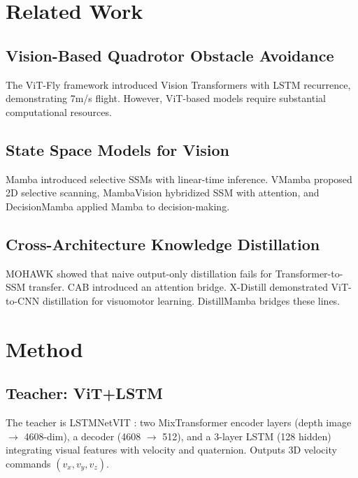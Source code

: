\documentclass{article}
\newcommand{\method}{DistillMamba\xspace}
\begin{document}
\section{Related Work}

\subsection{Vision-Based Quadrotor Obstacle Avoidance}
The ViT-Fly framework \cite{bhattacharya2024vitfly} introduced Vision Transformers with LSTM recurrence, demonstrating 7m/s flight. However, ViT-based models require substantial computational resources.

\subsection{State Space Models for Vision}
Mamba \cite{gu2023mamba} introduced selective SSMs with linear-time inference. VMamba \cite{liu2024vmamba} proposed 2D selective scanning, MambaVision \cite{hatamizadeh2024mambavision} hybridized SSM with attention, and DecisionMamba \cite{chen2024decisionmamba} applied Mamba to decision-making.

\subsection{Cross-Architecture Knowledge Distillation}
MOHAWK \cite{bick2024mohawk} showed that naive output-only distillation fails for Transformer-to-SSM transfer. CAB \cite{wang2025cab} introduced an attention bridge. X-Distill \cite{shao2025xdistill} demonstrated ViT-to-CNN distillation for visuomotor learning. \method bridges these lines.

\section{Method}

\subsection{Teacher: ViT+LSTM}
The teacher is LSTMNetVIT \cite{bhattacharya2024vitfly}: two MixTransformer encoder layers (depth image $\rightarrow$ 4608-dim), a decoder (4608 $\rightarrow$ 512), and a 3-layer LSTM (128 hidden) integrating visual features with velocity and quaternion. Outputs 3D velocity commands $(v_x, v_y, v_z)$.
\end{document}
